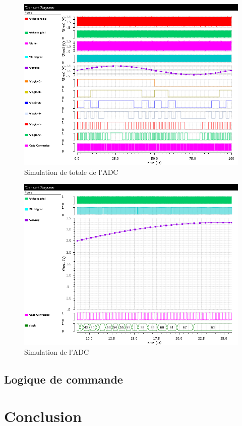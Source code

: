 \documentclass[a4paper]{article}
\begin{document}
\clearpage

\begin{figure}[!htb]
\begin{center}
  \includegraphics[width=0.7\linewidth]{Simulation-ADC-correct.png}
  \caption{Simulation de totale de l'ADC }
\end{center}
\end{figure}

\begin{figure}[!htb]
\begin{center}
  \includegraphics[width=0.7\linewidth]{Simulation-ADC-Bus-correct.png}
  \caption{Simulation de l'ADC}
\end{center}
\end{figure}


\clearpage
\subsection{Logique de commande}


\clearpage

\section{Conclusion}
\end{document}
